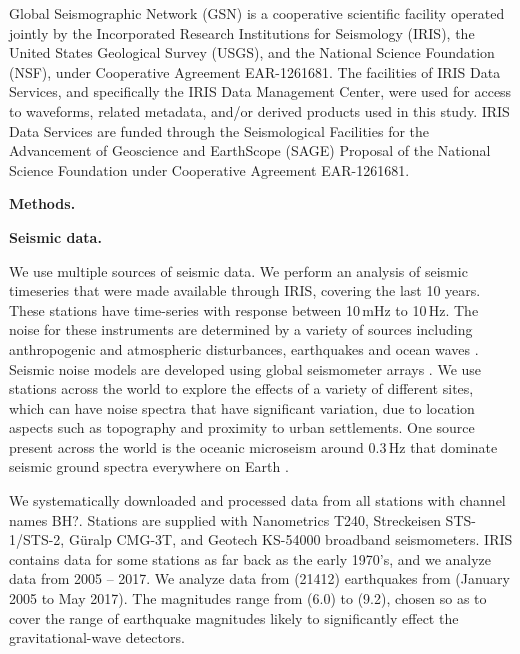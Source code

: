 \documentclass[preprint, aps, showpacs]{revtex4-1}
\newcommand{\rednote}[1]{{\color{red} (#1)}}
\begin{document}
Global Seismographic Network (GSN) is a cooperative scientific facility operated jointly by the Incorporated Research Institutions for Seismology (IRIS), the United States Geological Survey (USGS), and the National Science Foundation (NSF), under Cooperative Agreement EAR-1261681.
The facilities of IRIS Data Services, and specifically the IRIS Data Management Center, were used for access to waveforms, related metadata, and/or derived products used in this study. IRIS Data Services are funded through the Seismological Facilities for the Advancement of Geoscience and EarthScope (SAGE) Proposal of the National Science Foundation under Cooperative Agreement EAR-1261681.




\textbf{Methods.}

\textbf{Seismic data.}

We use multiple sources of seismic data.
We perform an analysis of seismic timeseries that were made available through IRIS, covering the last 10 years.
These stations have time-series with response between 10\,mHz to 10\,Hz.
The noise for these instruments are determined by a variety of sources including anthropogenic and atmospheric disturbances, earthquakes and ocean waves \cite{BCB2006}. 
Seismic noise models are developed using global seismometer arrays  \cite{Pet1993,BDE2004,McEA2009}.
We use stations across the world to explore the effects of a variety of different sites, which can have noise spectra that have significant variation, due to location aspects such as topography and proximity to urban settlements.
One source present across the world is the oceanic microseism around 0.3\,Hz that dominate seismic ground spectra everywhere on Earth \cite{HMS1963,ToLa1968,Ces1994,FKK1998}. 

We systematically downloaded and processed data from all stations with channel names BH?. Stations are supplied with Nanometrics T240, Streckeisen STS-1/STS-2, G\"uralp CMG-3T, and Geotech KS-54000 broadband seismometers. 
IRIS contains data for some stations as far back as the early 1970's, and we analyze data from 2005 -- 2017.
We analyze data from \rednote{21412} earthquakes from \rednote{January 2005 to May 2017}.
The magnitudes range from \rednote{6.0} to \rednote{9.2}, chosen so as to cover the range of earthquake magnitudes likely to significantly effect the gravitational-wave detectors.
\end{document}
